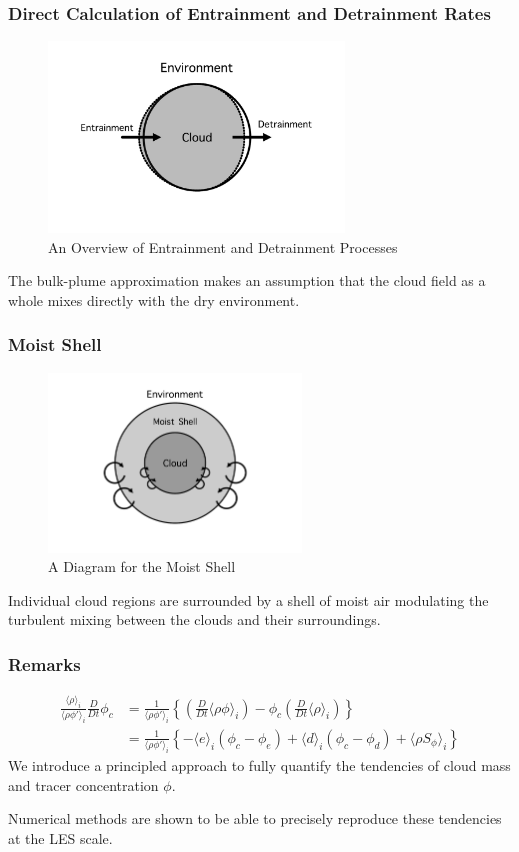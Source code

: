\documentclass{beamer}
\begin{document}
\begin{frame}
    \frametitle{Direct Calculation of Entrainment and Detrainment Rates}
    \begin{figure}
        \centering
        \includegraphics[width=0.7\textwidth]{img/ed.pdf}
        \caption{ An Overview of Entrainment and Detrainment Processes }
    \end{figure}
    The bulk-plume approximation makes an assumption that the cloud field as a whole mixes directly with the dry environment.
\end{frame}

\begin{frame}
    \frametitle{Moist Shell}
    \begin{figure}
        \centering
        \includegraphics[width=0.6\textwidth]{img/shell.pdf}
        \caption{ A Diagram for the Moist Shell }
    \end{figure}
    Individual cloud regions are surrounded by a shell of moist air modulating the turbulent mixing between the clouds and their surroundings.
\end{frame}

\begin{frame}
    \frametitle{Remarks}
    \begin{align*}
        \frac{\langle \rho \rangle _i}{\langle \rho \phi' \rangle _i} \frac{D}{D t} \phi_c
        &= \frac{1}{\langle \rho \phi' \rangle _i} \left\{ \left( \frac{D}{D t} \langle \rho \phi \rangle _i \right) - \phi_c \left( \frac{D}{D t} \langle \rho \rangle _i \right) \right\}
        \\
        &= \frac{1}{\langle \rho \phi' \rangle _i} \left\{ - \langle e \rangle _i (\phi_c - \phi_e) + \langle d \rangle _i (\phi_c - \phi_d) + \langle \rho S_\phi \rangle _i \right\}
    \end{align*}
    We introduce a principled approach to fully quantify the tendencies of cloud mass and tracer concentration $\phi$.

    Numerical methods are shown to be able to precisely reproduce these tendencies at the LES scale.
\end{frame}
\end{document}

